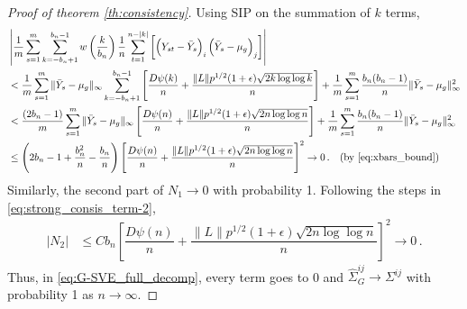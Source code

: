\documentclass[11pt]{article}
\theoremstyle{remark}
\begin{document}
\begin{proof}[Proof of theorem \ref{th:consistency}]
Using SIP on the summation of $k$ terms,
\begin{align*}
    & \left|\dfrac{1}{m}\sum_{s=1}^{m}\sum_{k=-b_n+1}^{b_n-1}w\left(\dfrac{k}{b_n}\right)\dfrac{1}{n}\sum_{t=1}^{n-|k|}\left[ \left(Y_{st} - \bar{Y}_s \right)_i  \left(\bar{Y}_s - \mu_g \right)_j \right] \right|\\
   &  < \dfrac{1}{m}\sum\limits_{s=1}^{m}\|\bar{Y}_s - \mu_g\|_{\infty}\sum\limits_{k=-b_n + 1}^{b_n-1}\left[ \dfrac{D \psi(k)}{n} + \dfrac{\|L\| p^{1/2}(1+\epsilon)\sqrt{2k \log\log k}}{n}  \right] + \dfrac{1}{m}\sum\limits_{s=1}^{m} \dfrac{b_n(b_n-1)}{n}\|\bar{Y}_s - \mu_g\|_{\infty}^2\\
   &  < \dfrac{(2b_n-1)}{m}\sum\limits_{s=1}^{m}\|\bar{Y}_s - \mu_g\|_{\infty}\left[ \dfrac{D \psi(n)}{n} + \dfrac{\|L\| p^{1/2}(1+\epsilon)\sqrt{2n \log\log n}}{n}  \right] + \dfrac{1}{m}\sum\limits_{s=1}^{m} \dfrac{b_n(b_n-1)}{n}\|\bar{Y}_s - \mu_g\|_{\infty}^2 \\
   &  \leq   \left(2b_n - 1 + \dfrac{b_n^2}{n} - \dfrac{b_n}{n}\right)\left[ \dfrac{D \psi(n)}{n} + \dfrac{\|L\| p^{1/2}(1+\epsilon)\sqrt{2n \log\log n}}{n}  \right]^2  \to 0\,. \quad  \text{(by \eqref{eq:xbars_bound})}
\end{align*}
%
% 
%
%
Similarly, the second part of $N_1 \to 0$ with probability 1. 
%
Following the steps in \eqref{eq:strong_consis_term-2}, 
\begin{align*}
    |N_2| & \leq Cb_n\left[ \dfrac{D \psi(n)}{n} + \dfrac{\|L\| p^{1/2}(1+\epsilon)\sqrt{2n \log\log n}}{n}  \right]^2  \to 0\,.
\end{align*}
Thus, in \eqref{eq:G-SVE_full_decomp}, every term goes to 0 and $\hat{\Sigma}_{G}^{ij} \to \Sigma^{ij}$ with probability 1 as $n \to \infty$. 
\end{proof}
\end{document}
